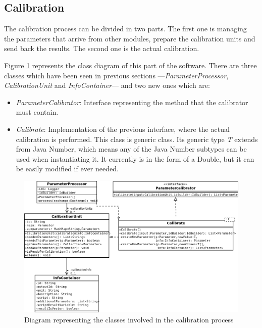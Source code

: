 \subsection{Calibration}
The calibration process can be divided in two parts. The first one is managing the parameters that arrive from other modules, prepare the calibration units and send back the results. The second one is the actual calibration. 

Figure \ref{f5.4} represents the class diagram of this part of the software. There are three classes which have been seen in previous sections ---\emph{ParameterProcessor}, \emph{CalibrationUnit} and \emph{InfoContainer}--- and two new ones which are:
\begin{itemize}
\item \emph{ParameterCalibrator}: Interface representing the method that the calibrator must contain.
\item \emph{Calibrate}: Implementation of the previous interface, where the actual calibration is performed. This class is generic class. Its generic type \emph{T} extends from Java Number, which means any of the Java Number subtypes can be used when instantiating it. It currently is in the form of a Double, but it can be easily modified if ever needed.
\end{itemize}


\begin{figure}[H]
\centerline{\includegraphics[width=1\textwidth]{images/CalibrationClassDiagram.png}}
\caption{Diagram representing the classes involved in the calibration process}
\label{f5.4}
\end{figure}

